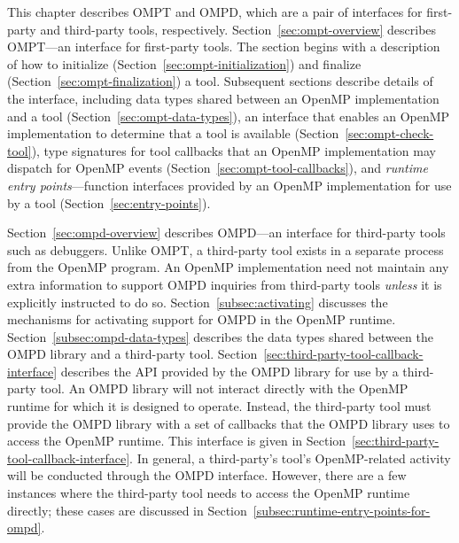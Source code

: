 

This chapter describes OMPT and OMPD, which are a pair of interfaces for first-party and third-party
tools, respectively.  Section~\ref{sec:ompt-overview} describes OMPT---an interface for first-party tools.
The section begins with a description of how to initialize (Section~\ref{sec:ompt-initialization})
and finalize (Section~\ref{sec:ompt-finalization}) a tool.
Subsequent sections describe details of the interface, including
data types shared between an OpenMP implementation and a tool
(Section~\ref{sec:ompt-data-types}),
an interface that enables an OpenMP implementation to determine that a
tool is available (Section~\ref{sec:ompt-check-tool}),
type signatures for tool callbacks
that an OpenMP implementation may dispatch for OpenMP events
(Section~\ref{sec:ompt-tool-callbacks}), and
\emph{runtime entry points}---function interfaces
provided by an OpenMP implementation for use by a tool
(Section~\ref{sec:entry-points}).

Section~\ref{sec:ompd-overview} describes
OMPD---an interface for  third-party tools such as debuggers.
Unlike OMPT, a third-party tool exists in a separate process from
the OpenMP program.
An OpenMP implementation need not maintain any extra information to support OMPD inquiries from third-party tools
\emph{unless} it is explicitly instructed to do so.
Section~\ref{subsec:activating} discusses the mechanisms for
activating support for OMPD in the OpenMP runtime.
Section~\ref{subsec:ompd-data-types}  describes the data types shared between the OMPD library and a third-party tool.
Section~\ref{sec:third-party-tool-callback-interface} describes the API provided by the OMPD library for use by a third-party tool.
An OMPD library will not interact directly with the OpenMP
runtime for which it is designed to operate.
Instead, the third-party tool must provide the OMPD library with a set of
callbacks that the OMPD library uses to access the OpenMP runtime.
This interface is given in
Section~\ref{sec:third-party-tool-callback-interface}.
In general, a third-party's tool's OpenMP-related activity will be
conducted through the OMPD interface.
However, there are a few instances where the third-party tool needs
to access the OpenMP runtime directly;
these cases are discussed in
Section~\ref{subsec:runtime-entry-points-for-ompd}.

